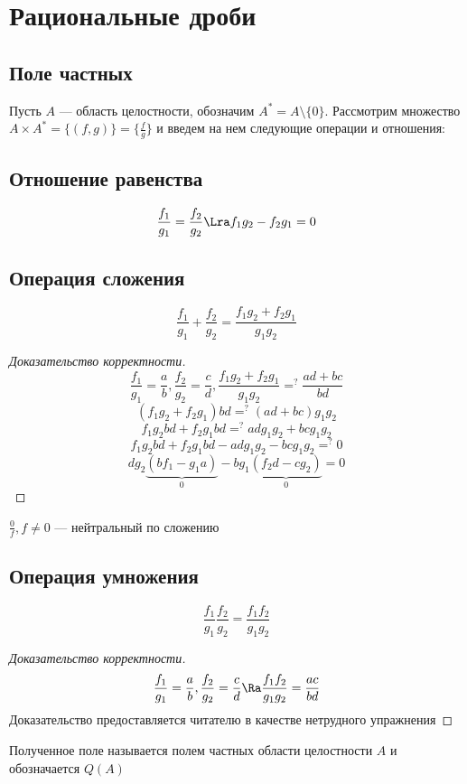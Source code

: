 
\section{Рациональные дроби}
\subsection{Поле частных}
Пусть \(A\) --- область целостности, обозначим  \(A^* = A\setminus\{0\}\). Рассмотрим множество \(A \times A^* = \{(f, g)\} = \{\frac{f}{g}\}\) и введем на нем следующие операции и отношения: 
\subsection{Отношение равенства}
    \[\frac{f_1}{g_1} = \frac{f_2}{g_2} \Lra f_1g_2 - f_2g_1 = 0\]
\subsection{Операция сложения}
\[\frac{f_1}{g_1} + \frac{f_2}{g_2} = \frac{f_1g_2 + f_2g_1}{g_1g_2}\]
\begin{proof}[Доказательство корректности]
    \[\frac{f_1}{g_1} = \frac{a}{b}, \frac{f_2}{g_2} = \frac{c}{d}, \frac{f_1g_2 + f_2g_1}{g_1g_2} =^? \frac{ad + bc}{bd}\]
    \[(f_1g_2 + f_2g_1)bd =^? (ad + bc)g_1g_2\]
    \[f_1g_2bd + f_2g_1bd =^? adg_1g_2 + bcg_1g_2\]
    \[f_1g_2bd + f_2g_1bd - adg_1g_2 - bcg_1g_2 =^? 0\]
    \[dg_2\underbrace{(bf_1 - g_1a)}_{0}  - bg_1\underbrace{(f_2d - cg_2)}_{0}  = 0\]
\end{proof}

\begin{note}
    \(\frac{0}{f}, f\ne 0 \) --- нейтральный по сложению
\end{note}

\subsection{Операция умножения}
\[\frac{f_1}{g_1}\frac{f_2}{g_2} = \frac{f_1f_2}{g_1g_2}\]
\begin{proof}[Доказательство корректности]
    \[\frac{f_1}{g_1} = \frac{a}{b}, \frac{f_2}{g_2} = \frac{c}{d} \Ra \frac{f_1f_2}{g_1g_2} = \frac{ac}{bd}\]
    Доказательство предоставляется читателю в качестве нетрудного упражнения
\end{proof}


\begin{definition}
    Полученное поле называется полем частных области целостности \(A\) и обозначается \(Q(A)\)
\end{definition}

